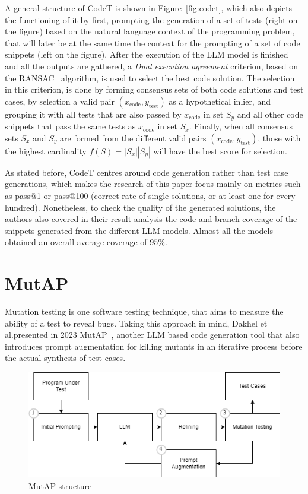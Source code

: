 \documentclass[%
  chapterprefix=false,%
  open=right,%
  twoside=true,%
  paper=a4,%
  logofile={Figures/logo.png},%
  thesistype=master,%
  UKenglish,%
]{se2thesis}
\begin{document}
A general structure of CodeT is shown in Figure~\ref{fig:codet}, which also depicts the functioning of it by first, prompting the generation of a set of tests (right on the figure) based on the natural language context of the programming problem, that will later be at the same time the context for the prompting of a set of code snippets (left on the figure).
After the execution of the LLM model is finished and all the outputs are gathered, a \textit{Dual execution agreement} criterion, based on the RANSAC~\cite{DBLP:journals/cacm/FischlerB81} algorithm, is used to select the best code solution.
The selection in this criterion, is done by forming consensus sets of both code solutions and test cases, by selection a valid pair \((x_\text{code}, y_\text{test})\) as a hypothetical inlier, and grouping it with all tests that are also passed by \(x_\text{code}\) in set \(S_y\) and all other code snippets that pass the same tests as \(x_\text{code}\) in set \(S_x\).
Finally, when all consensus sets \(S_x\) and \(S_y\) are formed from the different valid pairs \((x_\text{code}, y_\text{test})\), those with the highest cardinality \(f(S) = |S_x||S_y|\) will have the best score for selection.

As stated before, CodeT centres around code generation rather than test case generations, which makes the research of this paper focus mainly on metrics such as pass@1 or pass@100 (correct rate of single solutions, or at least one for every hundred).
Nonetheless, to check the quality of the generated solutions, the authors also covered in their result analysis the code and branch coverage of the snippets generated from the different LLM models.
Almost all the models obtained an overall average coverage of \(95\%\).

\section{MutAP}

Mutation testing is one software testing technique, that aims to measure the ability of a test to reveal bugs.
Taking this approach in mind, Dakhel et al.\@ presented in 2023 MutAP~\cite{DBLP:journals/corr/abs-2308-16557}, another LLM based code generation tool that also introduces prompt augmentation for killing mutants in an iterative process before the actual synthesis of test cases.

\begin{figure}[tb]
  \centering 
  \includegraphics[width=.99\textwidth]{Figures/mutap.png}
  \caption{MutAP structure}\label{fig:mutap}
\end{figure}
\end{document}
